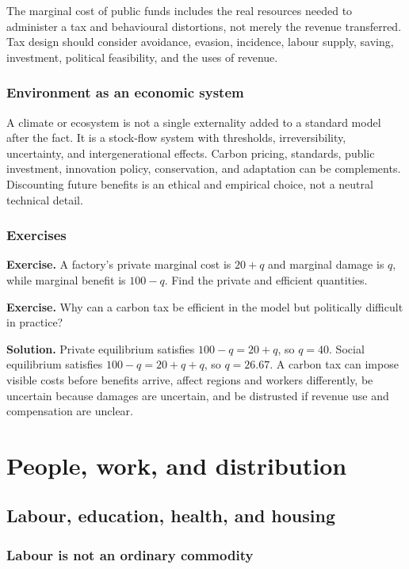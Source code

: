 \documentclass[11pt,oneside,openany]{book}
\newcommand{\exercise}[1]{\textbf{Exercise.} #1}
\newcommand{\solution}[1]{\textbf{Solution.} #1}
\begin{document}
The marginal cost of public funds includes the real resources needed to administer a tax and behavioural distortions, not merely the revenue transferred. Tax design should consider avoidance, evasion, incidence, labour supply, saving, investment, political feasibility, and the uses of revenue.

\section{Environment as an economic system}

A climate or ecosystem is not a single externality added to a standard model after the fact. It is a stock-flow system with thresholds, irreversibility, uncertainty, and intergenerational effects. Carbon pricing, standards, public investment, innovation policy, conservation, and adaptation can be complements. Discounting future benefits is an ethical and empirical choice, not a neutral technical detail.

\section{Exercises}

\exercise{A factory's private marginal cost is $20+q$ and marginal damage is $q$, while marginal benefit is $100-q$. Find the private and efficient quantities.}

\exercise{Why can a carbon tax be efficient in the model but politically difficult in practice?}

\solution{Private equilibrium satisfies $100-q=20+q$, so $q=40$. Social equilibrium satisfies $100-q=20+q+q$, so $q=26.67$. A carbon tax can impose visible costs before benefits arrive, affect regions and workers differently, be uncertain because damages are uncertain, and be distrusted if revenue use and compensation are unclear.}

\part{People, work, and distribution}

\chapter{Labour, education, health, and housing}
\label{ch:people}

\section{Labour is not an ordinary commodity}
\end{document}
